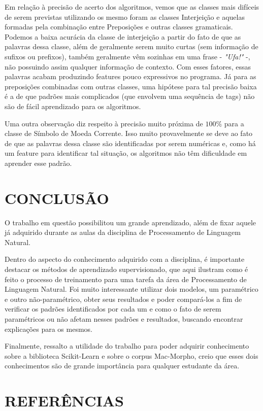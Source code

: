 \documentclass[12pt]{article}
\begin{document}
Em relação à precisão de acerto dos algoritmos, vemos que as classes mais
difíceis de serem previstas utilizando os mesmo foram as classes Interjeição e
aquelas formadas pela combinação entre Preposições e outras classes gramaticais.
Podemos a baixa acurácia da classe de interjeição a partir do fato de que as
palavras dessa classe, além de geralmente serem muito curtas (sem informação
de sufixos ou prefixos), também geralmente vêm sozinhas em uma frase -
 \textit{"Ufa!"} -, não possuindo assim qualquer informação de contexto. Com
 esses fatores, essas palavras acabam produzindo features pouco expressivos no
 programa. Já para as preposições combinadas com outras classes, uma hipótese
 para tal precisão baixa é a de que padrões mais complicados (que envolvem uma
 sequência de tags) não são de fácil aprendizado para os algoritmos.

Uma outra observação diz respeito à precisão muito próxima de $ 100\% $ para a
classe de Símbolo de Moeda Corrente. Isso muito provavelmente se deve ao fato de
que as palavras dessa classe são identificadas por serem numéricas e, como há
um feature para identificar tal situação, os algoritmos não têm dificuldade em
aprender esse padrão.

\section{CONCLUSÃO}

O trabalho em questão possibilitou um grande aprendizado, além de fixar aquele já adquirido durante as aulas da disciplina de Processamento de Linguagem
Natural.

Dentro do aspecto do conhecimento adquirido com a disciplina, é importante destacar os métodos de aprendizado supervisionado, que aqui ilustram como é
feito o processo de treinamento para uma tarefa da área de Processamento de
Linguagem Natural. Foi muito interessante utilizar dois modelos, um paramétrico
e outro não-paramétrico, obter seus resultados e poder compará-los a fim de
 verificar os padrões identificados por cada um e como o fato de serem
 paramétricos ou não afetam nesses padrões e resultados, buscando encontrar
 explicações para os mesmos.

Finalmente, ressalto a utilidade do trabalho para poder adquirir conhecimento
sobre a biblioteca Scikit-Learn e sobre o corpus Mac-Morpho, creio que esses
dois conhecimentos são de grande importância para qualquer estudante da área.

\section{REFERÊNCIAS}



\end{document}
